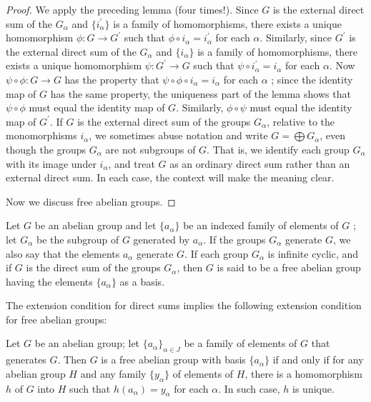 \begin{proof}
We apply the preceding lemma (four times!). Since \(G\) is the external direct sum of the \(G_{\alpha }\) and \(\{ i_{\alpha }^{\prime }\}\) is a family of homomorphisms, there exists a unique homomorphism \(\phi : G \rightarrow {G}^{\prime }\) such that \(\phi \circ {i}_{\alpha } = i_{\alpha }^{\prime }\) for each \(\alpha\). Similarly, since \(G^{\prime }\) is the external direct sum of the \(G_{\alpha }\) and \(\{ i_{\alpha }\}\) is a family of homomorphisms, there exists a unique homomorphism \(\psi : G^{\prime } \rightarrow G\) such that \(\psi \circ {i}_{\alpha }^{\prime } = i_{\alpha }\) for each \(\alpha\). Now \(\psi \circ \phi : G \rightarrow G\) has the property that \(\psi \circ \phi \circ {i}_{\alpha } = i_{\alpha }\) for each \(\alpha\) ; since the identity map of \(G\) has the same property, the uniqueness part of the lemma shows that \(\psi \circ \phi\) must equal the identity map of \(G\). Similarly, \(\phi \circ \psi\) must equal the identity map of \(G^{\prime }\).
If \(G\) is the external direct sum of the groups \(G_{\alpha }\), relative to the monomorphisms \(i_{\alpha }\), we sometimes abuse notation and write \(G = \bigoplus {G}_{\alpha }\), even though the groups \(G_{\alpha }\) are not subgroups of \(G\). That is, we identify each group \(G_{\alpha }\) with its image under \(i_{\alpha }\), and treat \(G\) as an ordinary direct sum rather than an external direct sum. In each case, the context will make the meaning clear.

Now we discuss free abelian groups.
\end{proof}
\begin{definition}
Let \(G\) be an abelian group and let \(\{ a_{\alpha }\}\) be an indexed family of elements of \(G\) ; let \(G_{\alpha }\) be the subgroup of \(G\) generated by \(a_{\alpha }\). If the groups \(G_{\alpha }\) generate \(G\), we also say that the elements \(a_{\alpha }\) generate \(G\). If each group \(G_{\alpha }\) is infinite cyclic, and if \(G\) is the direct sum of the groups \(G_{\alpha }\), then \(G\) is said to be a free abelian group having the elements \(\{ a_{\alpha }\}\) as a basis.
\end{definition}

The extension condition for direct sums implies the following extension condition for free abelian groups:

\begin{lemma}
\label{lem:\thetheorem}
Let \(G\) be an abelian group; let \({\{ a_{\alpha }\} }_{\alpha \in J}\) be a family of elements of \(G\) that generates \(G\). Then \(G\) is a free abelian group with basis \(\{ a_{\alpha }\}\) if and only if for any abelian group \(H\) and any family \(\{ y_{\alpha }\}\) of elements of \(H\), there is a homomorphism \(h\) of \(G\) into \(H\) such that \(h( a_{\alpha }) = y_{\alpha }\) for each \(\alpha\). In such case, \(h\) is unique.
\end{lemma}

